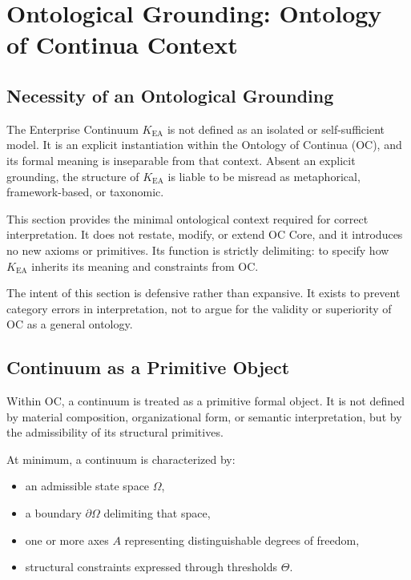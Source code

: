 
\section{Ontological Grounding: Ontology of Continua Context}

\subsection{Necessity of an Ontological Grounding}

The Enterprise Continuum $K_{\mathrm{EA}}$ is not defined as an isolated
or self-sufficient model.
It is an explicit instantiation within the Ontology of Continua (OC),
and its formal meaning is inseparable from that context.
Absent an explicit grounding, the structure of $K_{\mathrm{EA}}$ is
liable to be misread as metaphorical, framework-based, or taxonomic.

This section provides the minimal ontological context required for
correct interpretation.
It does not restate, modify, or extend OC Core, and it introduces no new
axioms or primitives.
Its function is strictly delimiting: to specify how $K_{\mathrm{EA}}$
inherits its meaning and constraints from OC.

The intent of this section is defensive rather than expansive.
It exists to prevent category errors in interpretation, not to argue
for the validity or superiority of OC as a general ontology.

\subsection{Continuum as a Primitive Object}

Within OC, a continuum is treated as a primitive formal object.
It is not defined by material composition, organizational form, or
semantic interpretation, but by the admissibility of its structural
primitives.

At minimum, a continuum is characterized by:
\begin{itemize}
  \item an admissible state space $\Omega$,
  \item a boundary $\partial\Omega$ delimiting that space,
  \item one or more axes $A$ representing distinguishable degrees of
        freedom,
  \item structural constraints expressed through thresholds $\Theta$.
\end{itemize}

